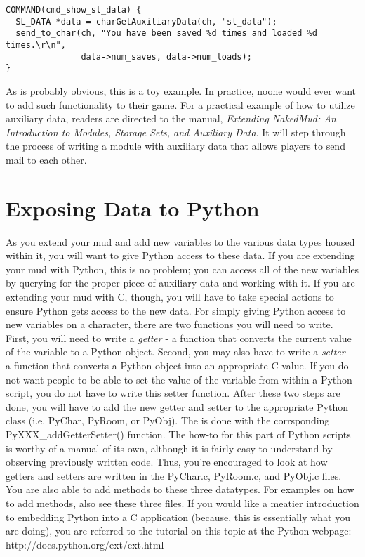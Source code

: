 \documentclass[fignum,doc]{article}
\begin{document}
\begin{doublespace}
\begin{singlespace} \begin{verbatim}
COMMAND(cmd_show_sl_data) {
  SL_DATA *data = charGetAuxiliaryData(ch, "sl_data");
  send_to_char(ch, "You have been saved %d times and loaded %d times.\r\n",
               data->num_saves, data->num_loads);
}
\end{verbatim} \end{singlespace}

\noindent As is probably obvious, this is a toy example. In practice, noone would ever want to add such functionality to their game. For a practical example of how to utilize auxiliary data, readers are directed to the manual, {\it Extending NakedMud: An Introduction to Modules, Storage Sets, and Auxiliary Data}. It will step through the process of writing a module with auxiliary data that allows players to send mail to each other.



\newpage \section{Exposing Data to Python}
As you extend your mud and add new variables to the various data types housed within it, you will want to give Python access to these data. If you are extending your mud with Python, this is no problem; you can access all of the new variables by querying for the proper piece of auxiliary data and working with it. If you are extending your mud with C, though, you will have to take special actions to ensure Python gets access to the new data. For simply giving Python access to new variables on a character, there are two functions you will need to write. First, you will need to write a {\it getter} - a function that converts the current value of the variable to a Python object. Second, you may also have to write a {\it setter} - a function that converts a Python object into an appropriate C value. If you do not want people to be able to set the value of the variable from within a Python script, you do not have to write this setter function. After these two steps are done, you will have to add the new getter and setter to the appropriate Python class (i.e. PyChar, PyRoom, or PyObj). The is done with the corrsponding PyXXX\_addGetterSetter() function. The how-to for this part of Python scripts is worthy of a manual of its own, although it is fairly easy to understand by observing previously written code. Thus, you're encouraged to look at how getters and setters are written in the PyChar.c, PyRoom.c, and PyObj.c files. You are also able to add methods to these three datatypes. For examples on how to add methods, also see these three files. If you would like a meatier introduction to embedding Python into a C application (because, this is essentially what you are doing), you are referred to the tutorial on this topic at the Python webpage: http://docs.python.org/ext/ext.html

\end{doublespace}
\end{document}
